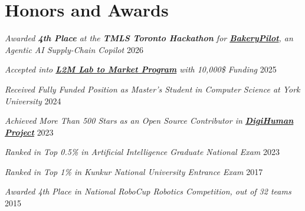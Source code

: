 \renewcommand{\subsection}[3]{
    \noindent\emph{#1}  \emph{#2} \hfill #3 \break
}
\section{Honors and Awards}
\subsection{Awarded \textbf{4th Place} at the \textbf{TMLS Toronto Hackathon} for \textbf{\href{https://bakerypilot.ca}{BakeryPilot}}, an Agentic AI Supply-Chain Copilot}{ }{2026}
\subsection{Accepted into \textbf{\href{https://www.lab2market.ca/}{L2M Lab to Market Program}} with 10,000\$ Funding}{ }{2025}
\subsection{Received Fully Funded Position as Master's Student in Computer Science at York University}{ }{2024}
\subsection{Achieved More Than 500 Stars as an Open Source Contributor in \textbf{\href{https://github.com/Danial-Kord/DigiHuman}{DigiHuman Project}}}{ }{2023}
\subsection{Ranked in Top 0.5\% in Artificial Intelligence Graduate National Exam}{ }{2023}
\subsection{Ranked in Top 1\% in Kunkur National University Entrance Exam}{ }{2017}
\subsection{Awarded 4th Place in National RoboCup Robotics Competition, out of 32 teams}{ }{2015}
